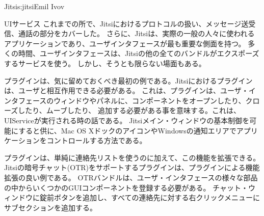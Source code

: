 \begin{aosachapter}{Jitsi}{s:jitsi}{Emil Ivov}
\begin{aosasect1}{UIサービス}
これまでの所で、Jitsiにおけるプロトコルの扱い、メッセージ送受信、通話の部分をカバーした。
さらに、Jitsiは、実際の一般の人々に使われるアプリケーションであり、ユーザインタフェースが最も重要な側面を持つ。
多くの時間、ユーザインタフェースは、Jitsiの他の全てのバンドルがエクスポーズするサービスを使う。
しかし、そうとも限らない場面もある。

プラグインは、気に留めておくべき最初の例である。Jitsiにおけるプラグインは、ユーザと相互作用できる必要がある。
これは、プラグインは、ユーザ・インタフェースのウィンドウやパネルに、コンポーネントをオープンしたり、クローズしたり、ムーブしたり、
追加する必要がある事を意味する。これは、UIServiceが実行される時の話である。
Jitsiメイン・ウィンドウの基本制御を可能にすると供に、Mac OS XドックのアイコンやWindowsの通知エリアでアプリケーションをコントロールする方法である。

プラグインは、単純に連絡先リストを使うのに加えて、この機能を拡張できる。
Jitsiの暗号チャット(OTR)をサポートするプラグインは、プラグインによる機能拡張の良い例である。
OTRバンドルは、ユーザ・インタフェースの様々な部品の中からいくつかのGUIコンポーネントを登録する必要がある。
チャット・ウィンドウに錠前ボタンを追加し、すべての連絡先に対する右クリックメニューにサブセクションを追加する。


\end{aosasect1}
\end{aosachapter}
